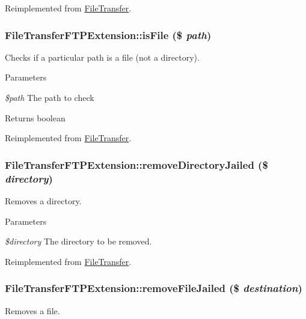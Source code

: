 Reimplemented from \hyperlink{classFileTransfer_a86c4289cfeccacf9bd2bcae8961889ab}{FileTransfer}.\hypertarget{classFileTransferFTPExtension_ab480d4c5aa1a5a95419155d6367dee43}{
\subsubsection[{isFile}]{\setlength{\rightskip}{0pt plus 5cm}FileTransferFTPExtension::isFile (\$ {\em path})}}
\label{classFileTransferFTPExtension_ab480d4c5aa1a5a95419155d6367dee43}
Checks if a particular path is a file (not a directory).


\begin{DoxyParams}{Parameters}
\item[{\em \$path}]The path to check\end{DoxyParams}
\begin{DoxyReturn}{Returns}
boolean 
\end{DoxyReturn}


Reimplemented from \hyperlink{classFileTransfer_a0522f0f47d022f2cf8fe375b983d4e39}{FileTransfer}.\hypertarget{classFileTransferFTPExtension_a2dc94e1f0b02a460914f8c3e8ef47d07}{
\subsubsection[{removeDirectoryJailed}]{\setlength{\rightskip}{0pt plus 5cm}FileTransferFTPExtension::removeDirectoryJailed (\$ {\em directory})}}
\label{classFileTransferFTPExtension_a2dc94e1f0b02a460914f8c3e8ef47d07}
Removes a directory.


\begin{DoxyParams}{Parameters}
\item[{\em \$directory}]The directory to be removed. \end{DoxyParams}


Reimplemented from \hyperlink{classFileTransfer_a9b9a21556d191235b3a5f85c15878789}{FileTransfer}.\hypertarget{classFileTransferFTPExtension_a60d622a655c4492a569b02d25d2aa376}{
\subsubsection[{removeFileJailed}]{\setlength{\rightskip}{0pt plus 5cm}FileTransferFTPExtension::removeFileJailed (\$ {\em destination})}}
\label{classFileTransferFTPExtension_a60d622a655c4492a569b02d25d2aa376}
Removes a file.


